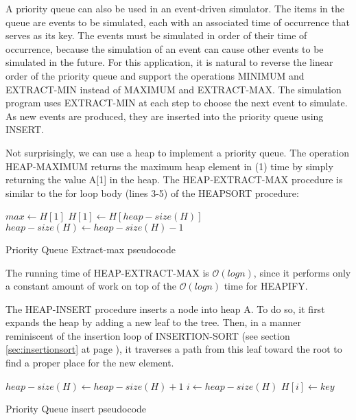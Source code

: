 A priority queue can also be used in an event-driven simulator. The items in the queue are events to be simulated, each with an associated time of occurrence that serves as its key. The events must be simulated in order of their time of occurrence, because the simulation of an event can cause other events to be simulated in the future. For this application, it is natural to reverse the linear order of the priority queue and support the operations MINIMUM and EXTRACT-MIN instead of MAXIMUM and EXTRACT-MAX. The simulation program uses EXTRACT-MIN at each step to choose the next event to simulate. As new events are produced, they are inserted into the priority queue using INSERT.

Not surprisingly, we can use a heap to implement a priority queue. The operation HEAP-MAXIMUM returns the maximum heap element in (1) time by simply returning the value A[1] in the heap. The HEAP-EXTRACT-MAX procedure is similar to the for loop body (lines 3-5) of the HEAPSORT procedure:

\begin{algorithm}[H]

$max \gets H[1]$\;
$H[1] \gets H[heap-size(H)]$\;
$heap-size(H) \gets heap-size(H) -1$\;
\;

\caption{Priority Queue Extract-max pseudocode}
\end{algorithm}

The running time of HEAP-EXTRACT-MAX is $\mathcal{O}(log n)$, since it performs only a constant amount of work on top of the $\mathcal{O}(log n)$ time for HEAPIFY.

The HEAP-INSERT procedure inserts a node into heap A. To do so, it first expands the heap by adding a new leaf to the tree. Then, in a manner reminiscent of the insertion loop of INSERTION-SORT (see section \ref{sec:insertionsort} at page \pageref{sec:insertionsort}), it traverses a path from this leaf toward the root to find a proper place for the new element.

\begin{algorithm}[H]
	$heap-size(H) \gets heap-size(H)+1$\;
	$i \gets heap-size(H)$\;
	$H[i] \gets key$
\caption{Priority Queue insert pseudocode}
\end{algorithm}


